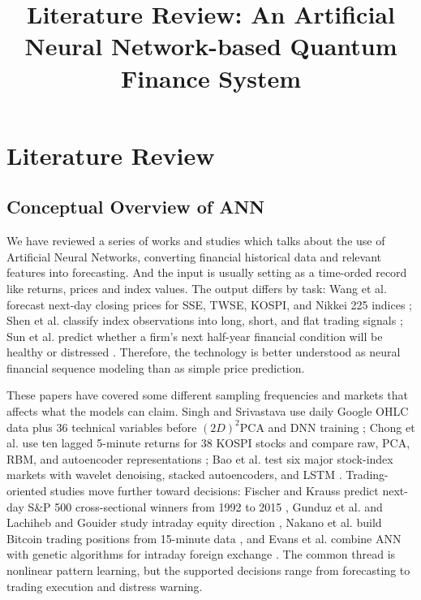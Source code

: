 \documentclass[conference]{IEEEtran}
\begin{document}
\title{Literature Review: An Artificial Neural Network-based Quantum Finance System}

\author{
\and
{}
\and
{}
\and
{}
}

\maketitle

\section{Literature Review}

\subsection{Conceptual Overview of ANN}
We have reviewed a series of works and studies which talks about the use of Artificial Neural Networks, converting financial historical data and relevant features into forecasting. And the input is usually setting as a time-orded record like returns, prices and index values. The output differs by task: Wang et al. forecast next-day closing prices for SSE, TWSE, KOSPI, and Nikkei 225 indices \cite{wang2016elman}; Shen et al. classify index observations into long, short, and flat trading signals \cite{shen2018gru}; Sun et al. predict whether a firm's next half-year financial condition will be healthy or distressed \cite{sun2011sffs}. Therefore, the technology is better understood as neural financial sequence modeling than as simple price prediction.

These papers have covered some different sampling frequencies and markets that affects what the models can claim. Singh and Srivastava use daily Google OHLC data plus 36 technical variables before $(2D)^2$PCA and DNN training \cite{singh2017stock}; Chong et al. use ten lagged 5-minute returns for 38 KOSPI stocks and compare raw, PCA, RBM, and autoencoder representations \cite{chong2017deep}; Bao et al. test six major stock-index markets with wavelet denoising, stacked autoencoders, and LSTM \cite{bao2017deep}. Trading-oriented studies move further toward decisions: Fischer and Krauss predict next-day S\&P 500 cross-sectional winners from 1992 to 2015 \cite{fischer2018deep}, Gunduz et al. and Lachiheb and Gouider study intraday equity direction \cite{gunduz2017intraday,lachiheb2018hierarchical}, Nakano et al. build Bitcoin trading positions from 15-minute data \cite{nakano2018bitcoin}, and Evans et al. combine ANN with genetic algorithms for intraday foreign exchange \cite{evans2013utilizing}. The common thread is nonlinear pattern learning, but the supported decisions range from forecasting to trading execution and distress warning.
\end{document}
